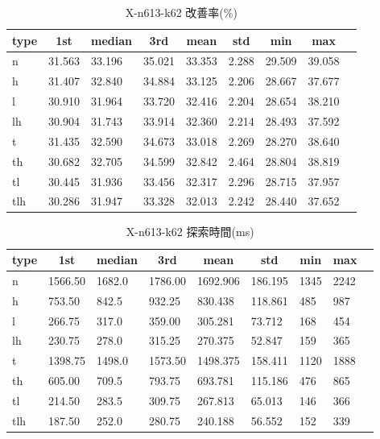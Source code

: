 \begin{table}[htbp]
    \centering
    \caption{X-n613-k62 改善率(\%)}
    \begin{tabular}{|l|l|l|l|l|l|l|l|l|}\hline
    \multicolumn{1}{|c|}{\textbf{type}}
    &\multicolumn{1}{|c|}{\textbf{1st}}
    &\multicolumn{1}{c|}{\textbf{median}}
    &\multicolumn{1}{c|}{\textbf{3rd}}
    &\multicolumn{1}{c|}{\textbf{mean}}
    &\multicolumn{1}{c|}{\textbf{std}}
    &\multicolumn{1}{c|}{\textbf{min}}
    &\multicolumn{1}{c|}{\textbf{max}}\\\hline
	n & 31.563 & 33.196 & 35.021 & 33.353 & 2.288 & 29.509 & 39.058\\\hline
	h & 31.407 & 32.840 & 34.884 & 33.125 & 2.206 & 28.667 & 37.677\\\hline
	l & 30.910 & 31.964 & 33.720 & 32.416 & 2.204 & 28.654 & 38.210\\\hline
	lh & 30.904 & 31.743 & 33.914 & 32.360 & 2.214 & 28.493 & 37.592\\\hline
	t & 31.435 & 32.590 & 34.673 & 33.018 & 2.269 & 28.270 & 38.640\\\hline
	th & 30.682 & 32.705 & 34.599 & 32.842 & 2.464 & 28.804 & 38.819\\\hline
	tl & 30.445 & 31.936 & 33.456 & 32.317 & 2.296 & 28.715 & 37.957\\\hline
	tlh & 30.286 & 31.947 & 33.328 & 32.013 & 2.242 & 28.440 & 37.652\\\hline
	\end{tabular}
\end{table}
\begin{table}[htbp]
    \centering
    \caption{X-n613-k62 探索時間(ms)}
    \begin{tabular}{|l|l|l|l|l|l|l|l|l|}\hline
    \multicolumn{1}{|c|}{\textbf{type}}
    &\multicolumn{1}{|c|}{\textbf{1st}}
    &\multicolumn{1}{c|}{\textbf{median}}
    &\multicolumn{1}{c|}{\textbf{3rd}}
    &\multicolumn{1}{c|}{\textbf{mean}}
    &\multicolumn{1}{c|}{\textbf{std}}
    &\multicolumn{1}{c|}{\textbf{min}}
    &\multicolumn{1}{c|}{\textbf{max}}\\\hline
	n & 1566.50 & 1682.0 & 1786.00 & 1692.906 & 186.195 & 1345 & 2242\\\hline
	h & 753.50 & 842.5 & 932.25 & 830.438 & 118.861 & 485 & 987\\\hline
	l & 266.75 & 317.0 & 359.00 & 305.281 & 73.712 & 168 & 454\\\hline
	lh & 230.75 & 278.0 & 315.25 & 270.375 & 52.847 & 159 & 365\\\hline
	t & 1398.75 & 1498.0 & 1573.50 & 1498.375 & 158.411 & 1120 & 1888\\\hline
	th & 605.00 & 709.5 & 793.75 & 693.781 & 115.186 & 476 & 865\\\hline
	tl & 214.50 & 283.5 & 309.75 & 267.813 & 65.013 & 146 & 366\\\hline
	tlh & 187.50 & 252.0 & 280.75 & 240.188 & 56.552 & 152 & 339\\\hline
	\end{tabular}
\end{table}
